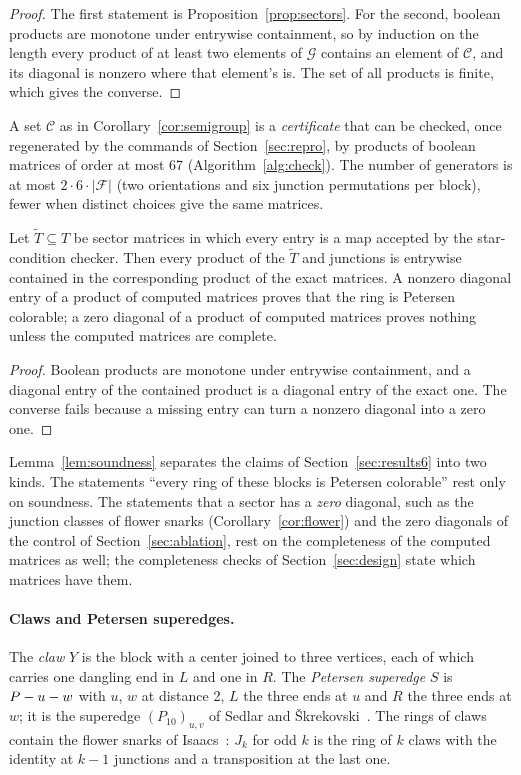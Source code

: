 \begin{proof}
The first statement is Proposition~\ref{prop:sectors}. For the second, boolean products are
monotone under entrywise containment, so by induction on the length every product of at least two
elements of $\mathcal{G}$ contains an element of $\mathcal{C}$, and its diagonal is nonzero where
that element's is. The set of all products is finite, which gives the converse.
\end{proof}

A set $\mathcal{C}$ as in Corollary~\ref{cor:semigroup} is a \emph{certificate} that can be checked, once regenerated by the commands of Section~\ref{sec:repro}, by
products of boolean matrices of order at most 67 (Algorithm~\ref{alg:check}). The number of generators is
at most $2 \cdot 6 \cdot |\mathcal{F}|$ (two orientations and six junction permutations per block), fewer when
distinct choices give the same matrices.

\begin{lemma}\label{lem:soundness}
Let $\tilde T \subseteq T$ be sector matrices in which every entry is a map accepted by the star-condition
checker. Then every product of the $\tilde T$ and junctions is entrywise contained in the corresponding product
of the exact matrices. A nonzero diagonal entry of a product of computed matrices proves that the ring is
Petersen colorable; a zero diagonal of a product of computed matrices proves nothing unless the computed matrices are
complete.
\end{lemma}

\begin{proof}
Boolean products are monotone under entrywise containment, and a diagonal entry of the contained product is a diagonal
entry of the exact one. The converse fails because a missing entry can turn a nonzero diagonal into a zero one.
\end{proof}

Lemma~\ref{lem:soundness} separates the claims of Section~\ref{sec:results6} into two kinds. The statements
``every ring of these blocks is Petersen colorable'' rest only on soundness. The statements that a sector has a
\emph{zero} diagonal, such as the junction classes of flower snarks (Corollary~\ref{cor:flower}) and the zero diagonals
of the control of Section~\ref{sec:ablation}, rest on the completeness of the computed matrices as well; the completeness
checks of Section~\ref{sec:design} state which matrices have them.

\paragraph{Claws and Petersen superedges.} The \emph{claw} $Y$ is the block with a center joined to
three vertices, each of which carries one dangling end in $L$ and one in $R$. The \emph{Petersen
superedge} $S$ is $P - u - w$ with $u$, $w$ at distance 2, $L$ the three ends at $u$ and $R$ the
three ends at $w$; it is the superedge $(P_{10})_{u,v}$ of Sedlar and \v{S}krekovski~\cite{SS2023}.
The rings of claws contain the flower snarks of Isaacs~\cite{Isaacs1975}: $J_k$ for odd $k$ is the
ring of $k$ claws with the identity at $k - 1$ junctions and a transposition at the last one.
